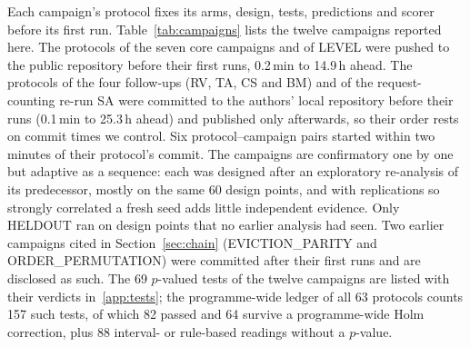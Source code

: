 Each campaign's protocol fixes its arms, design, tests, predictions and
scorer before its first run. Table~\ref{tab:campaigns} lists the twelve
campaigns reported here. The protocols of the seven core campaigns and of
LEVEL were pushed to the public repository before their first runs, 0.2\,min
to 14.9\,h ahead. The protocols of the four follow-ups (RV, TA, CS and BM) and
of the request-counting re-run SA were committed to the authors' local
repository before their runs (0.1\,min to 25.3\,h ahead) and published only
afterwards, so their order rests on commit times we control. Six
protocol--campaign pairs started within two minutes of their protocol's
commit. The campaigns are confirmatory one by one but adaptive as a
sequence: each was designed after an exploratory re-analysis of its
predecessor, mostly on the same 60 design points, and with replications so
strongly correlated a fresh seed adds little independent evidence. Only
HELDOUT ran on design points that no earlier analysis had seen. Two earlier
campaigns cited in Section~\ref{sec:chain} (EVICTION\_PARITY and
ORDER\_PERMUTATION) were committed after their first runs and are disclosed
as such. The 69 $p$-valued tests of the twelve campaigns are listed with
their verdicts in~\ref{app:tests}; the programme-wide ledger of all 63
protocols counts 157 such tests, of which 82 passed and 64 survive a
programme-wide Holm correction, plus 88 interval- or rule-based readings
without a $p$-value.

\begin{table}[t]
\caption{The twelve registered campaigns: seven core campaigns, four
follow-ups and the final level-field campaign (LEVEL, five experiments). Points: design points or BurstGPT windows. PASS: $p$-valued
tests passed, out of those registered (equivalence readings excluded).
BM runs three new arms against registered rows; the SA re-run of the JN
and TA runs (request counters only) is descriptive and not counted.}
\label{tab:campaigns}
\centering\footnotesize\setlength{\tabcolsep}{3.5pt}

\end{table}
